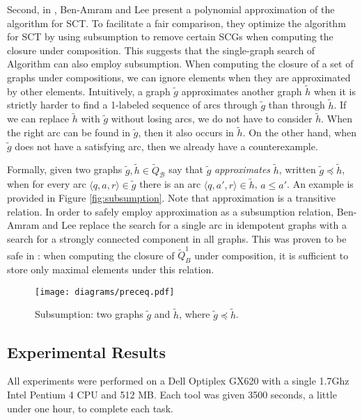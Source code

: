 \documentclass{LMCS}
\newcommand{\zug}[1]{\langle #1  \rangle}
\newcommand{\B}{{\mathcal B}}
\newcommand{\init}{{1}}
\renewcommand{\graph}{\widetilde}
\begin{document}
Second, in \cite{BL07}, Ben-Amram and Lee present a polynomial approximation
of the \LJB algorithm for SCT. To facilitate a fair comparison, they optimize the
\LJB algorithm for SCT by using subsumption to remove certain SCGs when computing
the closure under composition. This suggests that the single-graph search of
Algorithm \SGS can also employ subsumption.  When
computing the closure of a set of graphs under compositions, we can ignore
elements when they are approximated by other elements.  Intuitively, a graph
$\graph{g}$ approximates another graph $\graph{h}$ when it is strictly harder to
find a 1-labeled sequence of arcs through $\graph{g}$ than through $\graph{h}$.
If we can replace $\graph{h}$ with $\graph{g}$ without losing 
arcs, we do not have to consider $\graph{h}$.  When the right arc can be found
in $\graph{g}$, then it also occurs in $\graph{h}$. On the other hand, when
$\graph{g}$ does not have a satisfying arc, then we already have a
counterexample.

Formally, given two graphs $\graph{g}, \graph{h} \in \graph{Q}_\B$ say that $\graph{g}$
\emph{approximates} $\graph{h}$, written $\graph{g} \preceq \graph{h}$, when for every arc
$\zug{q,a,r} \in \graph{g}$ there is an arc $\zug{q,a',r} \in \graph{h}$, $a \leq a'$. An example is
provided in Figure \ref{fig:subsumption}. Note that approximation is a transitive relation.  In
order to safely employ approximation as a subsumption relation, Ben-Amram and Lee replace the search
for a single arc in idempotent graphs with a search for a strongly connected component in all
graphs. This was proven to be safe in \cite{Fog08}: when computing the closure of
$\graph{Q}_B^\init$ under composition, it is sufficient to store only maximal elements under this
relation. 

\begin{figure}[tb]
\begin{center}
\texttt{[image: diagrams/preceq.pdf]}
\end{center}
\caption{Subsumption: two graphs $\graph{g}$ and $\graph{h}$, where
$\graph{g} \preceq \graph{h}$.}\label{fig:subsumption}
\label{fig:preceq}
\end{figure}

\subsection{Experimental Results}

All experiments were performed on a Dell Optiplex GX620 with a
single 1.7Ghz Intel Pentium 4 CPU and 512 MB. Each tool was given 3500
seconds, a little under one hour, to complete each task.
\end{document}
